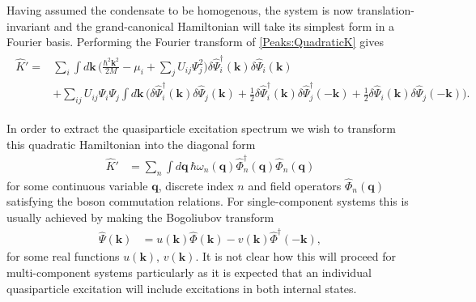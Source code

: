 Having assumed the condensate to be homogenous, the system is now translation-invariant and the grand-canonical Hamiltonian will take its simplest form in a Fourier basis. Performing the Fourier transform of \eqref{Peaks:QuadraticK} gives
\begin{align}
    \begin{split}
        \hat{K}' =& \sum_i \int d\mathbf{k}\, \bigg(\frac{\hbar^2 \mathbf{k}^2}{2M} - \mu_i + \sum_j U_{ij} \Psi_j^2\bigg) \delta\hat{\Psi}_i^\dagger(\mathbf{k}) \delta\hat{\Psi}_i(\mathbf{k}) \\
        &+ \sum_{i j} U_{i j}\Psi_i \Psi_j\int d\mathbf{k}\, \Big( \delta\hat{\Psi}_i^\dagger(\mathbf{k}) \delta\hat{\Psi}_j(\mathbf{k}) + \frac{1}{2}\delta\hat{\Psi}_i^\dagger(\mathbf{k}) \delta\hat{\Psi}_j^\dagger (-\mathbf{k}) + \frac{1}{2} \delta\hat{\Psi}_i(\mathbf{k}) \delta\hat{\Psi}_j(-\mathbf{k})\Big) .
    \end{split}
    \label{Peaks:QuadraticKKSpace}
\end{align}

In order to extract the quasiparticle excitation spectrum we wish to transform this quadratic Hamiltonian into the diagonal form
\begin{align}
    \hat{K}' &= \sum_n \int d\mathbf{q}\, \hbar \omega_n(\mathbf{q}) \hat{\Phi}_n^\dagger(\mathbf{q}) \hat{\Phi}_n(\mathbf{q}) \label{Peaks:DesiredQuadraticForm}
\end{align}
for some continuous variable $\mathbf{q}$, discrete index $n$ and field operators $\hat{\Phi}_n(\mathbf{q})$ satisfying the boson commutation relations. For single-component systems this is usually achieved by making the Bogoliubov transform
\begin{align}
    \hat{\Psi}(\mathbf{k}) &= u(\mathbf{k}) \hat{\Phi}(\mathbf{k}) - v(\mathbf{k}) \hat{\Phi}^\dagger(-\mathbf{k}), \label{Peaks:BogoliubovTransformation}
\end{align}
for some real functions $u(\mathbf{k})$, $v(\mathbf{k})$. It is not clear how this will proceed for multi-component systems particularly as it is expected that an individual quasiparticle excitation will include excitations in both internal states.

